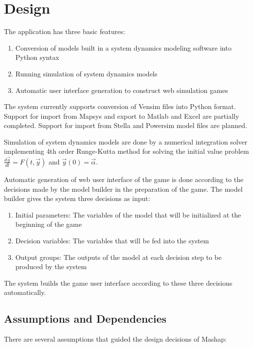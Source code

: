 \documentclass[12pt,a4paper]{paper}
\begin{document}
\section{Design}

The application has three basic features:

\begin{enumerate}
	\item Conversion of models built in a system dynamics modeling software into Python syntax
	\item Running simulation of system dynamics models
	\item Automatic user interface generation to construct web simulation games
\end{enumerate}

The system currently supports conversion of Vensim files into Python format. Support for import from Mapsys and export to Matlab and Excel are partially completed. Support for import from Stella and Powersim model files are planned.

Simulation of system dynamics models are done by a numerical integration solver implementing 4th order Runge-Kutta method for solving the initial value problem $\frac{d\vec{y}}{dt}=F(t,\vec{y})$ and $\vec{y}(0)=\vec{\alpha}$.

Automatic generation of web user interface of the game is done according to the decisions made by the model builder in the preparation of the game. The model builder gives the system three decisions as input:

\begin{enumerate}
	\item Initial parameters: The variables of the model that will be initialized at the beginning of the game
	\item Decision variables: The variables that will be fed into the system
	\item Output groups: The outputs of the model at each decision step to be produced by the system
\end{enumerate}

The system builds the game user interface according to these three decisions automatically.

\subsection{Assumptions and Dependencies}

There are several assumptions that guided the design decisions of Mashap:
\end{document}
